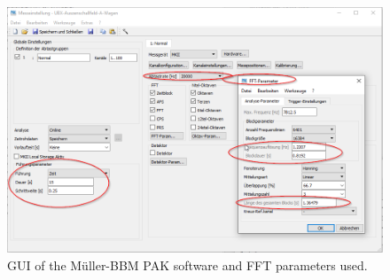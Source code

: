 \begin{figure}[H]
    \centering
    \includegraphics[width=\linewidth]{fig/fft_parameter.png}
    \caption{GUI of the Müller-BBM PAK software and FFT parameters used.}
    \label{fig:fftparameter}
\end{figure}

